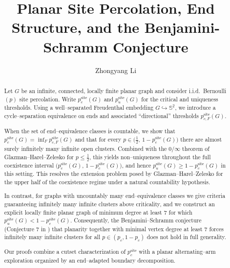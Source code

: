 \documentclass[11pt]{amsart}
\title{Planar Site Percolation, End Structure, and the Benjamini-Schramm Conjecture}
\author{Zhongyang Li}
\theoremstyle{plain}
\numberwithin{equation}{section}
\numberwithin{figure}{section}
\begin{document}
\maketitle


\begin{abstract}
Let $G$ be an infinite, connected, locally finite planar graph and consider i.i.d.\ Bernoulli$(p)$ site percolation.
Write $p_c^{\mathrm{site}}(G)$ and $p_u^{\mathrm{site}}(G)$ for the critical and uniqueness thresholds.
Using a well--separated Freudenthal embedding $G\hookrightarrow\mathbb S^2$, we introduce a cycle--separation equivalence on ends and associated
``directional'' thresholds $p^{\mathrm{site}}_{c,F}(G)$.

When the set of end--equivalence classes is countable, we show that
$p_c^{\mathrm{site}}(G)=\inf_F p^{\mathrm{site}}_{c,F}(G)$ and that for every
$p\in\bigl(\tfrac12,\,1-p_c^{\mathrm{site}}(G)\bigr)$ there are almost surely infinitely many infinite open clusters.
Combined with the $0/\infty$ theorem of Glazman--Harel--Zelesko for $p\le \tfrac12$, this yields non--uniqueness throughout the full coexistence interval
$\bigl(p_c^{\mathrm{site}}(G),\,1-p_c^{\mathrm{site}}(G)\bigr)$, and hence $p_u^{\mathrm{site}}(G)\ge 1-p_c^{\mathrm{site}}(G)$ in this setting.
This resolves the extension problem posed by Glazman--Harel--Zelesko for the upper half of the coexistence regime under a natural countability hypothesis.

In contrast, for graphs with uncountably many end--equivalence classes we give criteria guaranteeing infinitely many infinite clusters above criticality,
and we construct an explicit locally finite planar graph of minimum degree at least $7$ for which
$p_u^{\mathrm{site}}(G)<1-p_c^{\mathrm{site}}(G)$.
Consequently, the Benjamini--Schramm conjecture (Conjecture 7 in \cite{bs96}) that planarity together with minimal vertex degree at least 7 forces infinitely many infinite clusters for all
$p\in(p_c,1-p_c)$ does not hold in full generality.

Our proofs combine a cutset characterization of $p_c^{\mathrm{site}}$ with a planar alternating--arm exploration organized by an end--adapted boundary decomposition.
\end{abstract}
\end{document}
